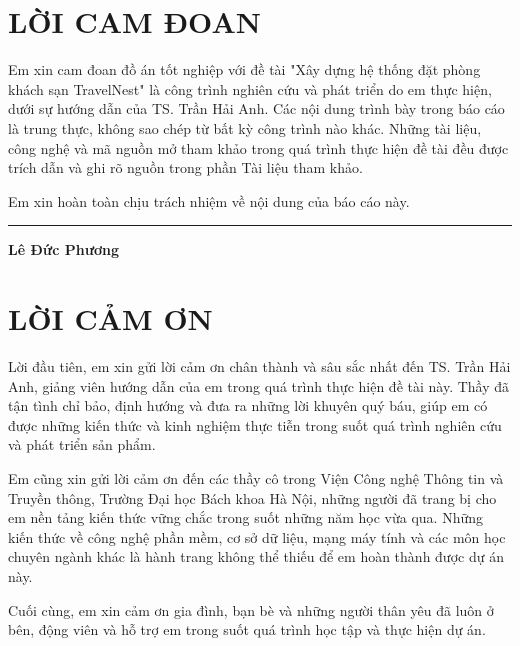 \documentclass[13pt,a4paper,twoside]{report}
\begin{document}
\chapter*{LỜI CAM ĐOAN}

Em xin cam đoan đồ án tốt nghiệp với đề tài "Xây dựng hệ thống đặt phòng khách sạn TravelNest" là công trình nghiên cứu và phát triển do em thực hiện, dưới sự hướng dẫn của TS. Trần Hải Anh. Các nội dung trình bày trong báo cáo là trung thực, không sao chép từ bất kỳ công trình nào khác. Những tài liệu, công nghệ và mã nguồn mở tham khảo trong quá trình thực hiện đề tài đều được trích dẫn và ghi rõ nguồn trong phần Tài liệu tham khảo.

Em xin hoàn toàn chịu trách nhiệm về nội dung của báo cáo này.

\vspace{1cm}
\begin{flushright}
  \begin{minipage}{5cm}
    \centering
    \hrule
    \textbf{Lê Đức Phương}
  \end{minipage}
\end{flushright}

\newpage

\chapter*{LỜI CẢM ƠN}

Lời đầu tiên, em xin gửi lời cảm ơn chân thành và sâu sắc nhất đến TS. Trần Hải Anh, giảng viên hướng dẫn của em trong quá trình thực hiện đề tài này. Thầy đã tận tình chỉ bảo, định hướng và đưa ra những lời khuyên quý báu, giúp em có được những kiến thức và kinh nghiệm thực tiễn trong suốt quá trình nghiên cứu và phát triển sản phẩm.

Em cũng xin gửi lời cảm ơn đến các thầy cô trong Viện Công nghệ Thông tin và Truyền thông, Trường Đại học Bách khoa Hà Nội, những người đã trang bị cho em nền tảng kiến thức vững chắc trong suốt những năm học vừa qua. Những kiến thức về công nghệ phần mềm, cơ sở dữ liệu, mạng máy tính và các môn học chuyên ngành khác là hành trang không thể thiếu để em hoàn thành được dự án này.

Cuối cùng, em xin cảm ơn gia đình, bạn bè và những người thân yêu đã luôn ở bên, động viên và hỗ trợ em trong suốt quá trình học tập và thực hiện dự án.
\end{document}
